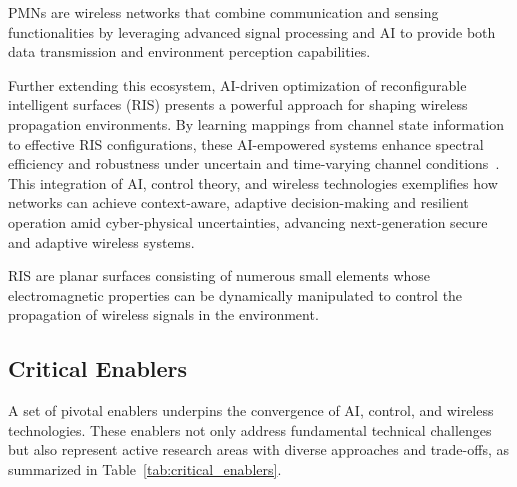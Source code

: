 \documentclass[sigconf]{acmart}
\begin{document}
\begin{definition}
PMNs are wireless networks that combine communication and sensing functionalities by leveraging advanced signal processing and AI to provide both data transmission and environment perception capabilities.
\end{definition}

Further extending this ecosystem, AI-driven optimization of reconfigurable intelligent surfaces (RIS) presents a powerful approach for shaping wireless propagation environments. By learning mappings from channel state information to effective RIS configurations, these AI-empowered systems enhance spectral efficiency and robustness under uncertain and time-varying channel conditions~\cite{ref48}. This integration of AI, control theory, and wireless technologies exemplifies how networks can achieve context-aware, adaptive decision-making and resilient operation amid cyber-physical uncertainties, advancing next-generation secure and adaptive wireless systems.

\begin{definition}
RIS are planar surfaces consisting of numerous small elements whose electromagnetic properties can be dynamically manipulated to control the propagation of wireless signals in the environment.
\end{definition}

\subsection{Critical Enablers}

A set of pivotal enablers underpins the convergence of AI, control, and wireless technologies. These enablers not only address fundamental technical challenges but also represent active research areas with diverse approaches and trade-offs, as summarized in Table~\ref{tab:critical_enablers}.
\end{document}
